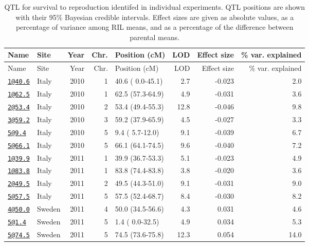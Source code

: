 \documentclass[]{article}
\begin{document}
\newpage

\begin{longtable}[]{@{}llrrlrrr@{}}
\caption{QTL for survival to reproduction identifed in individual
experiments. QTL positions are shown with their 95\% Bayesian credible
intervals. Effect sizes are given as absolute values, as a percentage of
variance among RIL means, and as a percentage of the difference between
parental means.}\tabularnewline
\toprule
Name & Site & Year & Chr. & Position (cM) & LOD & Effect size & \% var.
explained\tabularnewline
\midrule
\endfirsthead
\toprule
Name & Site & Year & Chr. & Position (cM) & LOD & Effect size & \% var.
explained\tabularnewline
\midrule
\endhead
\href{mailto:1@40.6}{\nolinkurl{1@40.6}} & Italy & 2010 & 1 & 40.6 (
0.0-45.1) & 2.7 & -0.023 & 2.0\tabularnewline
\href{mailto:1@62.5}{\nolinkurl{1@62.5}} & Italy & 2010 & 1 & 62.5
(57.3-64.9) & 4.9 & -0.031 & 3.6\tabularnewline
\href{mailto:2@53.4}{\nolinkurl{2@53.4}} & Italy & 2010 & 2 & 53.4
(49.4-55.3) & 12.8 & -0.046 & 9.8\tabularnewline
\href{mailto:3@59.2}{\nolinkurl{3@59.2}} & Italy & 2010 & 3 & 59.2
(37.9-65.9) & 4.5 & -0.027 & 3.3\tabularnewline
\href{mailto:5@9.4}{\nolinkurl{5@9.4}} & Italy & 2010 & 5 & 9.4 (
5.7-12.0) & 9.1 & -0.039 & 6.7\tabularnewline
\href{mailto:5@66.1}{\nolinkurl{5@66.1}} & Italy & 2010 & 5 & 66.1
(64.1-74.5) & 9.6 & -0.040 & 7.2\tabularnewline
\href{mailto:1@39.9}{\nolinkurl{1@39.9}} & Italy & 2011 & 1 & 39.9
(36.7-53.3) & 5.1 & -0.023 & 4.9\tabularnewline
\href{mailto:1@83.8}{\nolinkurl{1@83.8}} & Italy & 2011 & 1 & 83.8
(74.4-83.8) & 3.8 & -0.020 & 3.6\tabularnewline
\href{mailto:2@49.5}{\nolinkurl{2@49.5}} & Italy & 2011 & 2 & 49.5
(44.3-51.0) & 9.1 & -0.031 & 9.0\tabularnewline
\href{mailto:5@57.5}{\nolinkurl{5@57.5}} & Italy & 2011 & 5 & 57.5
(52.4-68.7) & 8.4 & -0.030 & 8.2\tabularnewline
\href{mailto:4@50.0}{\nolinkurl{4@50.0}} & Sweden & 2011 & 4 & 50.0
(34.5-56.6) & 4.3 & 0.031 & 4.6\tabularnewline
\href{mailto:5@1.4}{\nolinkurl{5@1.4}} & Sweden & 2011 & 5 & 1.4 (
0.0-32.5) & 4.9 & 0.034 & 5.3\tabularnewline
\href{mailto:5@74.5}{\nolinkurl{5@74.5}} & Sweden & 2011 & 5 & 74.5
(73.6-75.8) & 12.3 & 0.054 & 14.0\tabularnewline
\bottomrule
\end{longtable}

\newpage
\end{document}

